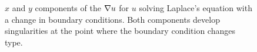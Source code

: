 \begin{figure}[!h]
\centering
{}
\caption{$x$ and $y$ components of the $\Grad u$ for $u$ solving Laplace's equation with a change in boundary conditions.  Both components develop singularities at the point where the boundary condition changes type.}
\label{fig:laplaceStresses}
\end{figure}

